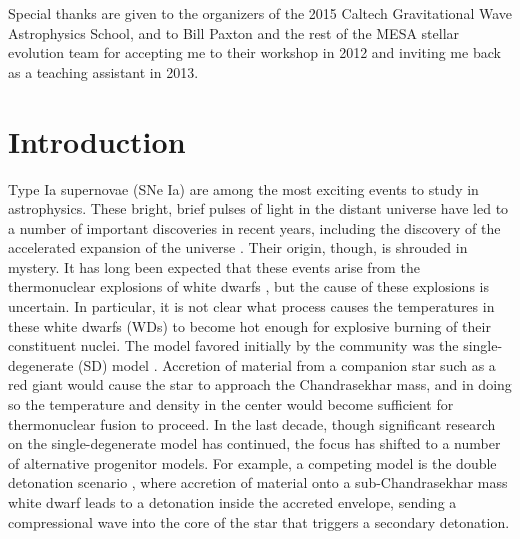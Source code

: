 \documentclass[12pt]{article}
\begin{document}
Special thanks are given to the organizers of the 2015 Caltech
Gravitational Wave Astrophysics School, and to Bill Paxton and the
rest of the MESA stellar evolution team for accepting me to their
workshop in 2012 and inviting me back as a teaching assistant in 2013.



\newpage
{}
\section{Introduction}
\label{sec:introduction}

Type Ia supernovae (SNe Ia) are among the most exciting
events to study in astrophysics. These bright, brief pulses of light
in the distant universe have led to a number of important discoveries
in recent years, including the discovery of the accelerated expansion
of the universe \citep{perlmutter1999,riess1998}. Their origin, though,
is shrouded in mystery. It has long been expected that these
events arise from the thermonuclear explosions of white dwarfs
\citep{hoyle-fowler:1960}, but the cause of these explosions is
uncertain. In particular, it is not clear what process causes the
temperatures in these white dwarfs (WDs) to become hot enough for explosive
burning of their constituent nuclei. The model favored initially by the
community was the single-degenerate (SD) model
\citep{whelan-iben:1973}. Accretion of material from a companion star
such as a red giant would cause the star to approach the Chandrasekhar
mass, and in doing so the temperature and density in the center would
become sufficient for thermonuclear fusion to proceed. In the last decade,
though significant research on the single-degenerate model has
continued, the focus has shifted to a number of alternative progenitor models.
For example, a competing model is the double detonation scenario \citep{livne:1990,woosley:1994},
where accretion of material onto a sub-Chandrasekhar mass white dwarf
leads to a detonation inside the accreted envelope, sending a compressional
wave into the core of the star that triggers a secondary detonation.
\end{document}
